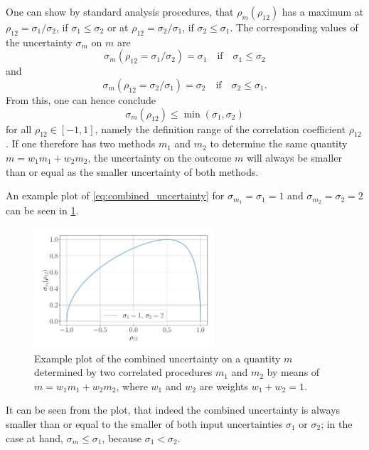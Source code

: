 \documentclass{report}
\numberwithin{tm}{section}
\begin{document}
\begin{equation}
\end{equation} One can show by standard analysis procedures, that $\rho_m(\rho_{12})$ has a maximum at $\rho_{12} = \sigma_1/\sigma_2$, if $\sigma_1 \leq \sigma_2$ or at $\rho_{12}= \sigma_2/\sigma_1$, if $\sigma_2 \leq \sigma_1$. The corresponding values of the uncertainty $\sigma_m$ on $m$ are \begin{equation}
\sigma_m(\rho_{12}=\sigma_1/\sigma_2) = \sigma_1 \quad \text{if} \quad \sigma_1 \leq \sigma_2
\end{equation} and \begin{equation} \sigma_m(\rho_{12}=\sigma_2/\sigma_1) = \sigma_2 \quad \text{if} \quad \sigma_2  \leq \sigma_1.
\end{equation} From this, one can hence conclude \begin{equation}
\sigma_m(\rho_{12}) \leq \min(\sigma_1,\sigma_2)
\end{equation} for all $\rho_{12} \in [-1,1]$, namely the definition range of the correlation coefficient $\rho_{12}$. If one therefore has two methods $m_1$ and $m_2$ to determine the same quantity $m = w_1m_1 + w_2m_2$, the uncertainty on the outcome $m$ will always be smaller than or equal as the smaller uncertainty of both methods.

An example plot of \cref{eq:combined_uncertainty} for $\sigma_{m_1} = \sigma_1 = 1$ and $\sigma_{m_2} = \sigma_2 = 2$ can be seen in \cref{fig:correlated_procedures}.
\begin{figure}[h]
	\centering
	\includegraphics[width=0.6\textwidth]{figures/correlated_procedures.pdf}
	\caption{Example plot of the combined uncertainty on a quantity $m$ determined by two correlated procedures $m_1$ and $m_2$ by means of $m = w_1m_1 + w_2m_2$, where $w_1$ and $w_2$ are weights $w_1 + w_2 = 1$.}
	\label{fig:correlated_procedures}
\end{figure}
It can be seen from the plot, that indeed the combined uncertainty is always smaller than or equal to the smaller of both input uncertainties $\sigma_1$ or $\sigma_2$; in the case at hand, $\sigma_m \leq \sigma_1$, because $\sigma_1 < \sigma_2$.
\end{document}
